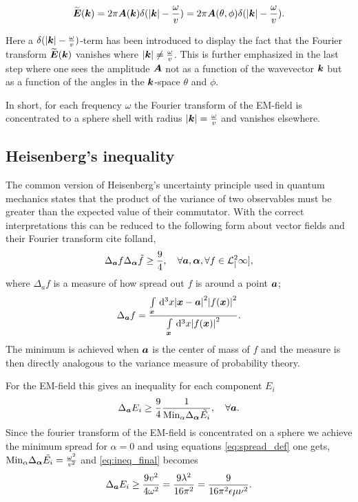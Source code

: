 \documentclass[11pt,a4paper, 
english, swedish %
]{article}
\newcommand{\Lsq}[1]{\ensuremath{\mathcal{L}^2_{#1}}}
\begin{document}
\begin{equation}
  \label{eq:f_transf}
  \widetilde{\vb*E}(\vb*k)=2\pi\vb*A(\vb*k)\delta(\abs{\vb*k}-\frac{\omega}{v})=2\pi\vb*A(\theta,\phi)\delta(\abs{\vb*k}-\frac{\omega}{v}).
\end{equation}

Here a $\delta(\abs{\vb*k}-\frac{\omega}{v})$-term has been introduced to display the fact that the Fourier transform $\widetilde{\vb*E}(\vb*k)$ vanishes where $\abs{\vb*k} \neq\frac{\omega}{v}$.
This is further emphasized in the last step where one sees the amplitude $\vb*A$ not as a function of the wavevector $\vb*k$ but as a function of the angles in the $\vb*k$-space $\theta$ and $\phi$.

In short, for each frequency $\omega$ the Fourier transform of the EM-field is concentrated to a sphere shell with radius $\abs{\vb*k}=\frac{\omega}{v}$ and vanishes elsewhere.

\subsection{Heisenberg's inequality}
The common version of Heisenberg's uncertainty principle used in quantum mechanics states that the product of the variance of two observables must be greater than the expected value of their commutator. With the correct interpretations this can be reduced to the following form about vector fields and their Fourier transform cite folland, 
\begin{equation}
\Delta_{\vb*a}f \Delta_{\vb*\alpha} \tilde{f} \geq \frac{9}{4}, \quad \forall \vb*a, \vb*\alpha, \forall f \in \Lsq[\infty],
\end{equation}
where $\Delta_af$ is a measure of how spread out $f$ is around a point $\vb*a$;
\begin{equation}
  \label{eq:spread_def}
\Delta_{\vb*a}f=\frac{\int_{\vb*x}\id^3x\abs{\vb*x-\vb*a}^2\abs{f(\vb*x)}^2}{\int_{\vb*x}\id^3x\abs{f(\vb*x)}^2}.
\end{equation}
The minimum is achieved when $\vb*a$ is the center of mass of $f$ and the measure is then directly analogous to the variance measure of probability theory.

For the EM-field this gives an inequality for each component $E_i$\footnotemark{}
\begin{equation}
  \label{eq:ineq_final}
  \Delta_{\vb*a}E_i\geq \frac{9}{4} \frac{1}{\mathrm{Min}_\alpha\Delta_{\vb*\alpha}\tilde{E_i}}, \quad \forall \vb*a.
\end{equation}
Since the fourier transform of the EM-field is concentrated on a sphere we achieve the minimum spread for $\alpha=0$ and using equations \ref{eq:spread_def} one gets,
$\mathrm{Min}_\alpha\Delta_{\vb*\alpha}\tilde{E_i}=\frac{\omega^2}{v^2}$ and \ref{eq:ineq_final} becomes
\begin{equation}
 \Delta_{\vb*a}E_i\geq \frac{9v^2}{4\omega^2}=\frac{9\lambda^2}{16\pi^2}=\frac{9}{16\pi^2\epsilon\mu\nu^2}.
 \end{equation}
\end{document}
